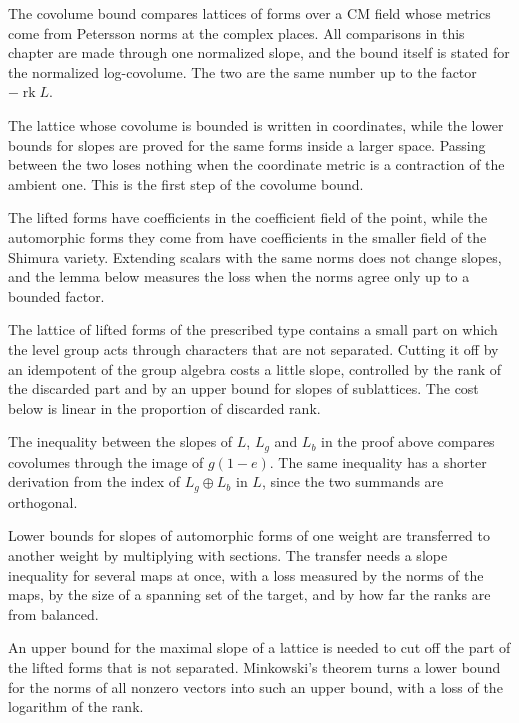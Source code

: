 The covolume bound compares lattices of forms over a CM field whose metrics come from
Petersson norms at the complex places. All comparisons in this chapter are made through one
normalized slope, and the bound itself is stated for the normalized log-covolume. The two
are the same number up to the factor $-\operatorname{rk}L$.

The lattice whose covolume is bounded is written in coordinates, while the lower bounds for
slopes are proved for the same forms inside a larger space. Passing between the two
loses nothing when the coordinate metric is a contraction of the ambient one. This is the
first step of the covolume bound.

The lifted forms have coefficients in the coefficient field of the point, while the automorphic
forms they come from have coefficients in the smaller field of the Shimura variety. Extending
scalars with the same norms does not change slopes, and the lemma below measures the loss when
the norms agree only up to a bounded factor.

The lattice of lifted forms of the prescribed type contains a small part on which the
level group acts through characters that are not separated. Cutting it off by an idempotent of
the group algebra costs a little slope, controlled by the rank of the discarded part and by
an upper bound for slopes of sublattices. The cost below is linear in the proportion of
discarded rank.

The inequality between the slopes of $L$, $L_g$ and $L_b$ in the proof above compares covolumes
through the image of $g(1-e)$. The same inequality has a shorter derivation from the index of
$L_g\oplus L_b$ in $L$, since the two summands are orthogonal.

Lower bounds for slopes of automorphic forms of one weight are transferred to another
weight by multiplying with sections. The transfer needs a slope inequality for several maps
at once, with a loss measured by the norms of the maps, by the size of a spanning set of
the target, and by how far the ranks are from balanced.

An upper bound for the maximal slope of a lattice is needed to cut off the part of the lifted
forms that is not separated. Minkowski's theorem turns a lower bound for the norms of all nonzero
vectors into such an upper bound, with a loss of the logarithm of the rank.


